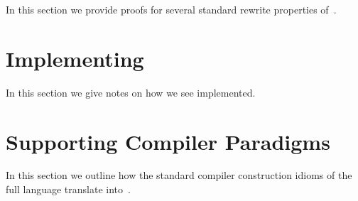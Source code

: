 \documentclass[letterpaper,11pt]{article}
\begin{document}
In this section we provide proofs for several standard rewrite properties of~\hax.




\section{Implementing \hax}
\label{sec:implement}

In this section we give notes on how we see \hax implemented.




\section{Supporting Compiler Paradigms}
\label{sec:compiling}

In this section we outline how the standard compiler construction idioms of the full \HAX language
translate into~\hax.
\end{document}
